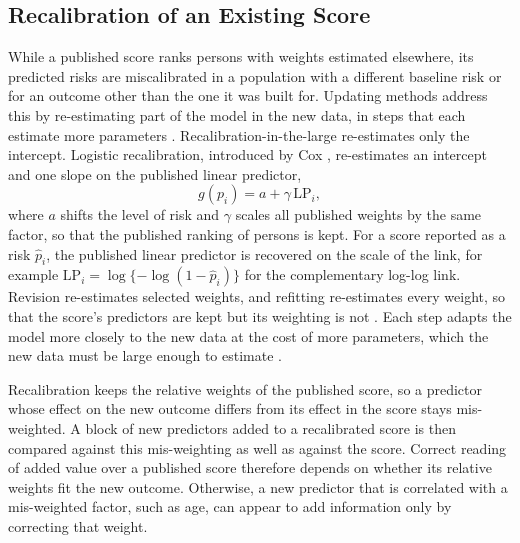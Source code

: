 \subsection{Recalibration of an Existing Score}
\label{sec:tech-recalibration}

While a published score ranks persons with weights estimated elsewhere, its predicted risks are miscalibrated in a population with a different baseline risk or for an outcome other than the one it was built for.
Updating methods address this by re-estimating part of the model in the new data, in steps that each estimate more parameters \cite{janssen2008updating, steyerberg2019cpm}.
Recalibration-in-the-large re-estimates only the intercept.
Logistic recalibration, introduced by Cox \cite{cox1958binary}, re-estimates an intercept and one slope on the published linear predictor,
\begin{equation}
  g(p_i) = a + \gamma\, \mathrm{LP}_i ,
  \label{eq:tech-recalibration}
\end{equation}
where $a$ shifts the level of risk and $\gamma$ scales all published weights by the same factor, so that the published ranking of persons is kept.
For a score reported as a risk $\hat p_i$, the published linear predictor is recovered on the scale of the link, for example $\mathrm{LP}_i = \log\{-\log(1 - \hat p_i)\}$ for the complementary log-log link.
Revision re-estimates selected weights, and refitting re-estimates every weight, so that the score's predictors are kept but its weighting is not \cite{janssen2008updating}.
Each step adapts the model more closely to the new data at the cost of more parameters, which the new data must be large enough to estimate \cite{steyerberg2019cpm}.

Recalibration keeps the relative weights of the published score, so a predictor whose effect on the new outcome differs from its effect in the score stays mis-weighted.
A block of new predictors added to a recalibrated score is then compared against this mis-weighting as well as against the score.
Correct reading of added value over a published score therefore depends on whether its relative weights fit the new outcome.
Otherwise, a new predictor that is correlated with a mis-weighted factor, such as age, can appear to add information only by correcting that weight.
